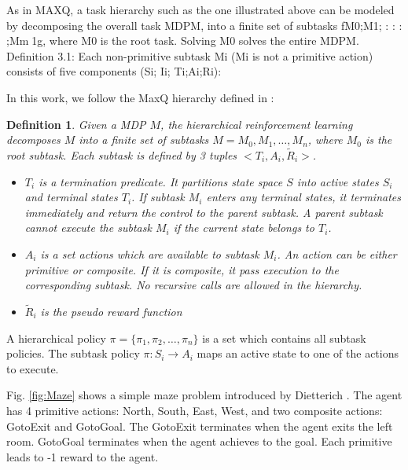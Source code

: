 \documentclass{article} %
\newtheorem{definition}{Definition}
\begin{document}

As in MAXQ, a task hierarchy such as the one illustrated above can be modeled by
decomposing the overall task MDPM, into a finite set of subtasks fM0;M1; : : : ;Mm􀀀1g,
where M0 is the root task. Solving M0 solves the entire MDPM.
Definition 3.1: Each non-primitive subtask Mi (Mi is not a primitive action) consists
of five components (Si; Ii; Ti;Ai;Ri):

In this work, we follow the MaxQ hierarchy defined in \cite{MaxQ}:
\begin{definition}
    Given a MDP $M$, the hierarchical reinforcement learning decomposes $M$ into a finite
    set of subtasks $M = {M_0, M_1, \dots, M_n}$, where $M_0$ is the root subtask. 
    Each subtask is defined by 3 tuples $<T_i, A_i, \tilde{R}_i>$. 
    \begin{itemize}{}
    \item $T_i$ is a termination predicate. It partitions state space $S$ into active states $S_i$ and
                terminal states $T_i$. If subtask $M_i$ enters any terminal states, it terminates immediately
                and return the control to the parent subtask. A parent subtask cannot execute the subtask
                $M_i$ if the current state belongs to $T_i$.
    \item $A_i$ is a set actions which are available to subtask $M_i$. An action can be either primitive or composite.
                If it is composite, it pass execution to the corresponding subtask. No recursive calls 
                are allowed in the hierarchy.
    \item $\tilde{R}_i$ is the pseudo reward function 
    \end{itemize}
\end{definition}
A hierarchical policy $\pi = \{\pi_1, \pi_2, \dots, \pi_n\}$ is a set which contains all subtask policies. 
The subtask policy $\pi: S_i \rightarrow A_i$ maps an active state to one of the actions to execute.

Fig. \ref{fig:Maze} shows a simple maze problem introduced by Dietterich \cite{MaxQJ}.
The agent has 4 primitive actions: North, South, East, West, and two composite actions: GotoExit and GotoGoal.
The 
GotoExit terminates when the agent exits the left room. GotoGoal terminates when the agent achieves to the goal.
Each primitive leads to -1 reward to the agent.
\end{document}
